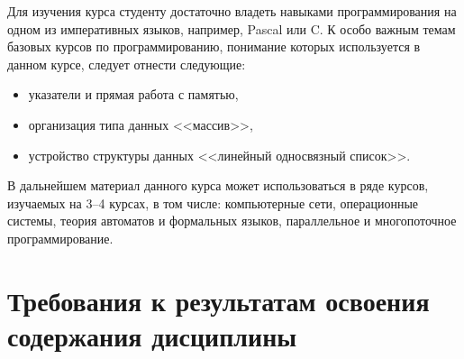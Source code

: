 	\ssect %
Для изучения курса \thecourse{}
студенту достаточно владеть навыками программирования на одном из императивных языков, например, Pascal или C. К особо важным темам базовых курсов по программированию, понимание которых используется в данном курсе, следует отнести следующие:
\begin{itemize}
	\item указатели и прямая работа с памятью,
	\item организация типа данных <<массив>>,
	\item устройство структуры данных <<линейный односвязный список>>.
\end{itemize}

	\ssect
В дальнейшем материал данного курса может использоваться в ряде курсов,
изучаемых на 3--4 курсах, в том числе: компьютерные сети, операционные системы, теория автоматов и формальных языков, параллельное и многопоточное
программирование.

\section{Требования к результатам освоения содержания дисциплины}


